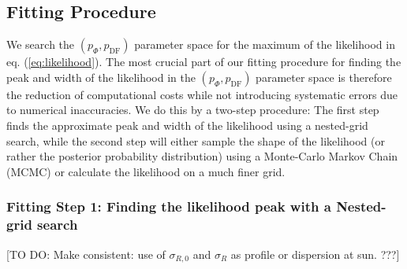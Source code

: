 \subsection{Fitting Procedure} \label{sec:fitting}

We search the $(p_\Phi,p_\text{DF})$ parameter space for the maximum of the likelihood in eq. (\ref{eq:likelihood}). The most crucial part of our fitting procedure for finding the peak and width of the likelihood in the $(p_\Phi,p_\text{DF})$ parameter space  is therefore the reduction of computational costs while not introducing systematic errors due to numerical inaccuracies. We do this by a two-step procedure: The first step finds the approximate peak and width of the likelihood using a nested-grid search, while the second step will either sample the shape of the likelihood (or rather the posterior probability distribution) using a Monte-Carlo Markov Chain (MCMC) or calculate the likelihood on a much finer grid.

\subsubsection{Fitting Step 1: Finding the likelihood peak with a Nested-grid search}

[TO DO: Make consistent: use of $\sigma_{R,0}$ and $\sigma_R$ as profile or dispersion at sun. ???]

